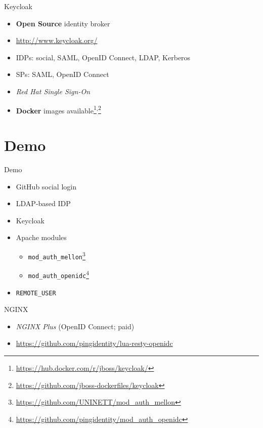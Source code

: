 \documentclass[ignorenonframetext,aspectratio=169]{beamer}
\providecommand{\tightlist}{%
  \setlength{\itemsep}{0pt}\setlength{\parskip}{0pt}}
\begin{document}
\begin{frame}{Keycloak}

\begin{itemize}
\tightlist
\item {\bf Open Source} identity broker
\item \url{http://www.keycloak.org/}
\item IDPs: social, SAML, OpenID Connect, LDAP, Kerberos
\item SPs: SAML, OpenID Connect
\item {\em Red Hat Single Sign-On}
\item {\bf Docker} images available\footnote{
        \url{https://hub.docker.com/r/jboss/keycloak/}
    }\textsuperscript{,}\footnote{
        \url{https://github.com/jboss-dockerfiles/keycloak}
    }
\end{itemize}
\end{frame}

\section{Demo}

\begin{frame}{Demo}
\begin{itemize}
\item GitHub social login
\item LDAP-based IDP
\item Keycloak
\item Apache modules
    \begin{itemize}
    \item {\tt mod\_auth\_mellon}\footnote{\url{https://github.com/UNINETT/mod_auth_mellon}}
    \item {\tt mod\_auth\_openidc}\footnote{\url{https://github.com/pingidentity/mod_auth_openidc}}
    \end{itemize}
\item {\tt REMOTE\_USER}
\end{itemize}
\end{frame}

\begin{frame}[fragile]{NGINX}
\begin{itemize}
\tightlist
\item {\em NGINX Plus} (OpenID Connect; paid)
\item \url{https://github.com/pingidentity/lua-resty-openidc}
\end{itemize}
\end{frame}
\end{document}
